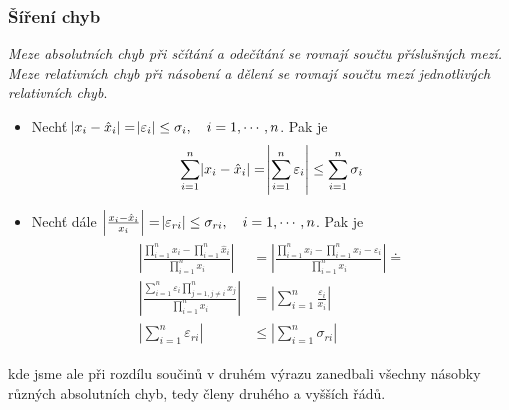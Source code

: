       \subsubsection{Šíření chyb}
        \emph{Meze absolutních chyb při sčítání a odečítání se rovnají součtu pří\-sluš\-ných mezí.
        Meze relativních chyb při násobení a dělení se rovnají součtu mezí jednotlivých relativních
        chyb}.
        \begin{itemize}
          \item Nechť  \(\abs{x_i-\hat{x}_i}=\abs{\varepsilon_i}\leq\sigma_i,\quad i=1,\cdots,n\).
                Pak je
                \begin{equation}\label{nm:eq_sireni_abs_err}
                  \sum_{i=1}^n\abs{x_i-\hat{x}_i}=
                  \abs{\sum_{i=1}^n{\varepsilon_i}}\leq\sum_{i=1}^n{\sigma_i}
                \end{equation}
  
          \item Nechť dále \(\left\lvert\frac{x_i-\hat{x}_i}{x_i}\right\rvert =
                \abs{\varepsilon_{ri}} \leq \sigma_{ri},\quad i=1,\cdots,n\). Pak je
                \begin{gather*}
                  \begin{align*}
                    \left\lvert\frac{\prod_{i=1}^n{x_i}-\prod_{i=1}^n{\hat{x}_i}}
                                    {\prod_{i=1}^n{x_i}}\right\rvert                           &=
                    \left\lvert\frac{\prod_{i=1}^n{x_i}-\prod_{i=1}^n{x_i-\varepsilon_i}}
                              {\prod_{i=1}^n{x_i}}\right\rvert\doteq                            \\  
                    \left\lvert\frac{\sum_{i=1}^n{\varepsilon_i}\prod_{j=1,j\neq i}^n{x_j}}
                              {\prod_{i=1}^n{x_i}}\right\rvert                                 &=
                              \left\lvert\sum_{i=1}^n{\frac{\varepsilon_i}{x_i}}\right\rvert    \\
                    \left\lvert\sum_{i=1}^n{\varepsilon_{ri}}\right\rvert                      &\leq
                                \left\lvert\sum_{i=1}^n{\sigma_{ri}}\right\rvert
                \end{align*}
              \end{gather*}
        \end{itemize}
        kde jsme ale při rozdílu součinů v druhém výrazu zanedbali všechny násobky různých
        absolutních chyb, tedy členy druhého a vyšších řádů.
  
